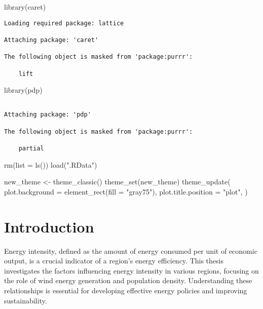 \documentclass[
]{report}
\newenvironment{Shaded}{\begin{snugshade}}{\end{snugshade}}
\newcommand{\AttributeTok}[1]{\textcolor[rgb]{0.40,0.45,0.13}{#1}}
\newcommand{\FunctionTok}[1]{\textcolor[rgb]{0.28,0.35,0.67}{#1}}
\newcommand{\NormalTok}[1]{\textcolor[rgb]{0.00,0.23,0.31}{#1}}
\newcommand{\OtherTok}[1]{\textcolor[rgb]{0.00,0.23,0.31}{#1}}
\newcommand{\StringTok}[1]{\textcolor[rgb]{0.13,0.47,0.30}{#1}}
\begin{document}
\begin{Shaded}
\begin{Highlighting}[]
\FunctionTok{library}\NormalTok{(caret)}
\end{Highlighting}
\end{Shaded}

\begin{verbatim}
Loading required package: lattice

Attaching package: 'caret'

The following object is masked from 'package:purrr':

    lift
\end{verbatim}

\begin{Shaded}
\begin{Highlighting}[]
\FunctionTok{library}\NormalTok{(pdp)}
\end{Highlighting}
\end{Shaded}

\begin{verbatim}

Attaching package: 'pdp'

The following object is masked from 'package:purrr':

    partial
\end{verbatim}

\begin{Shaded}
\begin{Highlighting}[]
\FunctionTok{rm}\NormalTok{(}\AttributeTok{list =} \FunctionTok{ls}\NormalTok{())}
\FunctionTok{load}\NormalTok{(}\StringTok{".RData"}\NormalTok{)}

\NormalTok{new\_theme }\OtherTok{\textless{}{-}} \FunctionTok{theme\_classic}\NormalTok{()}
\FunctionTok{theme\_set}\NormalTok{(new\_theme)}
\FunctionTok{theme\_update}\NormalTok{(}
  \AttributeTok{plot.background =} \FunctionTok{element\_rect}\NormalTok{(}\AttributeTok{fill =} \StringTok{"gray75"}\NormalTok{),}
  \AttributeTok{plot.title.position =} \StringTok{"plot"}\NormalTok{,}
\NormalTok{)}
\end{Highlighting}
\end{Shaded}

\hypertarget{introduction}{%
\chapter{Introduction}\label{introduction}}

Energy intensity, defined as the amount of energy consumed per unit of
economic output, is a crucial indicator of a region's energy efficiency.
This thesis investigates the factors influencing energy intensity in
various regions, focusing on the role of wind energy generation and
population density. Understanding these relationships is essential for
developing effective energy policies and improving sustainability.
\end{document}
